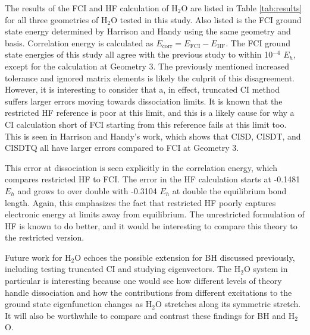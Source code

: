 \documentclass[final,3p,times,twocolumn]{elsarticle}
\begin{document}
The results of the FCI and HF calculation of H$_2$O are listed in Table \ref{tab:results} for all three geometries of H$_2$O tested in this study. Also listed is the FCI ground state energy determined by Harrison and Handy using the same geometry and basis.\cite{handy-1983} Correlation energy is calculated as $E_{\text{corr}} = E_{\text{FCI}} - E_{\text{HF}}$. The FCI ground state energies of this study all agree with the previous study to within 10$^{-4}$ $E_h$, except for the calculation at Geometry 3. The previously mentioned increased tolerance and ignored matrix elements is likely the culprit of this disagreement. However, it is interesting to consider that a, in effect, truncated CI method suffers larger errors moving towards dissociation limits. It is known that the restricted HF reference is poor at this limit, and this is a likely cause for why a CI calculation short of FCI starting from this reference fails at this limit too. This is seen in Harrison and Handy's work, which shows that CISD, CISDT, and CISDTQ all have larger errors compared to FCI at Geometry 3.\cite{handy-1983}

This error at dissociation is seen explicitly in the correlation energy, which compares restricted HF to FCI. The error in the HF calculation starts at -0.1481 $E_h$ and grows to over double with -0.3104 $E_h$ at double the equilibrium bond length. Again, this emphasizes the fact that restricted HF poorly captures electronic energy at limits away from equilibrium. The unrestricted formulation of HF is known to do better, and it would be interesting to compare this theory to the restricted version. %

Future work for H$_2$O echoes the possible extension for BH discussed previously, including testing truncated CI and studying eigenvectors. The H$_2$O system in particular is interesting because one would see how different levels of theory handle dissociation and how the contributions from different excitations to the ground state eigenfunction changes as H$_2$O stretches along its symmetric stretch. It will also be worthwhile to compare and contrast these findings for BH and H$_2$O.

\end{document}

